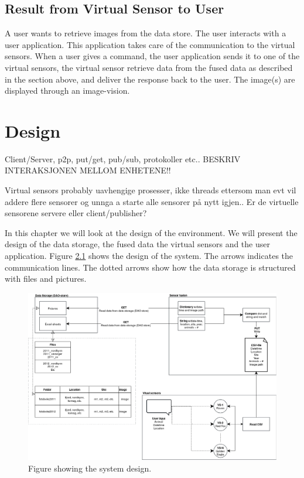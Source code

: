 \documentclass[USenglish]{uit-thesis}
\begin{document}
\section{Result from Virtual Sensor to User}
A user wants to retrieve images from the data store.
The user interacts with a user application. This application takes care of the communication to the virtual sensors. When a user gives a command, the user application sends it to one of the virtual sensors, the virtual sensor retrieve data from the fused data as described in the section above, and deliver the response back to the user. The image(s) are displayed through an image-vision.


\chapter{Design}
Client/Server, p2p, put/get, pub/sub, protokoller etc..
BESKRIV INTERAKSJONEN MELLOM ENHETENE!!

Virtual sensors probably uavhengige prosesser, ikke threads ettersom man evt vil addere flere sensorer og unnga a starte alle sensorer på nytt igjen..
Er de virtuelle sensorene servere eller client/publisher?

In this chapter we will look at the design of the environment. We will present the design of the data storage, the fused data the virtual sensors and the user application. Figure \ref{fig:design} shows the design of the system. The arrows indicates the communication lines. The dotted arrows show how the data storage is structured with files and pictures.


\begin{figure}
\centering
\includegraphics[width=\textwidth]{Design.png}
\caption{Figure showing the system design.}
\label{fig:design}
\end{figure}
\end{document}
